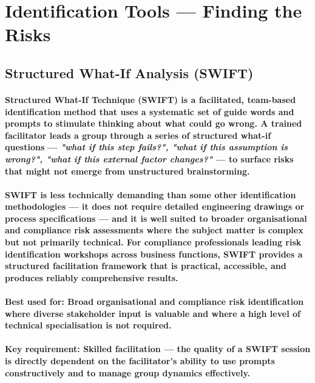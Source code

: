 \section{Identification Tools — Finding the Risks}

\subsection{Structured What-If Analysis (SWIFT)}
\paragraph{\textbf{Structured What-If Technique (SWIFT)} is a facilitated, team-based identification method that uses a systematic set of guide words and prompts to stimulate thinking about what could go wrong. A trained facilitator leads a group through a series of structured what-if questions — \textit{"what if this step fails?", "what if this assumption is wrong?", "what if this external factor changes?"} — to surface risks that might not emerge from unstructured brainstorming.}
\paragraph{SWIFT is less technically demanding than some other identification methodologies — it does not require detailed engineering drawings or process specifications — and it is well suited to broader organisational and compliance risk assessments where the subject matter is complex but not primarily technical. For compliance professionals leading risk identification workshops across business functions, SWIFT provides a structured facilitation framework that is practical, accessible, and produces reliably comprehensive results.}
\paragraph{\textbf{Best used for}: Broad organisational and compliance risk identification where diverse stakeholder input is valuable and where a high level of technical specialisation is not required.}
\paragraph{\textbf{Key requirement}: Skilled facilitation — the quality of a SWIFT session is directly dependent on the facilitator's ability to use prompts constructively and to manage group dynamics effectively.}

